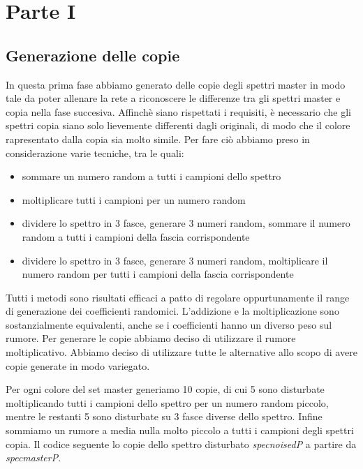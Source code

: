 \chapter{Parte I}

\section{Generazione delle copie}
In questa prima fase abbiamo generato delle copie degli spettri master in modo tale da poter allenare la rete a riconoscere le differenze tra gli spettri master e copia nella fase succesiva. Affinchè siano rispettati i requisiti, è necessario che gli spettri copia siano solo lievemente differenti dagli originali, di modo che il colore rapresentato dalla copia sia molto simile. Per fare ciò abbiamo preso in considerazione varie tecniche, tra le quali:
\begin{itemize}
	\item sommare un numero random a tutti i campioni dello spettro
	\item moltiplicare tutti i campioni per un numero random
	\item dividere lo spettro in 3 fasce, generare 3 numeri random, sommare il numero random a tutti i campioni della fascia corrispondente
	\item dividere lo spettro in 3 fasce, generare 3 numeri random, moltiplicare il numero random per tutti i campioni della fascia corrispondente
\end{itemize}

Tutti i metodi sono risultati efficaci a patto di regolare oppurtunamente il range di generazione dei coefficienti randomici. L'addizione e la moltiplicazione sono sostanzialmente equivalenti, anche se i coefficienti hanno un diverso peso sul rumore. Per generare le copie abbiamo deciso di utilizzare il rumore moltiplicativo. Abbiamo deciso di utilizzare tutte le alternative allo scopo di avere copie generate in modo variegato.

Per ogni colore del set master generiamo 10 copie, di cui 5 sono disturbate moltiplicando tutti i campioni dello spettro per un numero random piccolo, mentre le restanti 5 sono disturbate su 3 fasce diverse dello spettro. Infine sommiamo un rumore a media nulla molto piccolo a tutti i campioni degli spettri copia. Il codice seguente lo copie dello spettro disturbato \textit{specnoisedP} a partire da \textit{specmasterP}.

